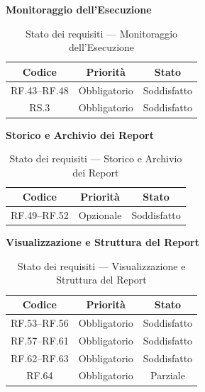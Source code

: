 \documentclass[12pt, a4paper]{article}
\begin{document}
\medskip
\noindent\textbf{Monitoraggio dell'Esecuzione}
\medskip

\begin{table}[H]
    \centering
    \renewcommand{\arraystretch}{1.3}
    \begin{tabular}{|c|c|c|}
        \hline
        \textbf{Codice} & \textbf{Priorità} & \textbf{Stato} \\ \hline
        RF.43--RF.48 & Obbligatorio & Soddisfatto \\ \hline
        RS.3 & Obbligatorio & Soddisfatto \\ \hline
    \end{tabular}
    \caption{Stato dei requisiti — Monitoraggio dell'Esecuzione}
    \label{tab:req-monitoraggio}
\end{table}

\medskip
\noindent\textbf{Storico e Archivio dei Report}
\medskip

\begin{table}[H]
    \centering
    \renewcommand{\arraystretch}{1.3}
    \begin{tabular}{|c|c|c|}
        \hline
        \textbf{Codice} & \textbf{Priorità} & \textbf{Stato} \\ \hline
        RF.49--RF.52 & Opzionale & Soddisfatto \\ \hline
    \end{tabular}
    \caption{Stato dei requisiti — Storico e Archivio dei Report}
    \label{tab:req-storico}
\end{table}

\medskip
\noindent\textbf{Visualizzazione e Struttura del Report}
\medskip

\begin{table}[H]
    \centering
    \renewcommand{\arraystretch}{1.3}
    \begin{tabular}{|c|c|c|}
        \hline
        \textbf{Codice} & \textbf{Priorità} & \textbf{Stato} \\ \hline
        RF.53--RF.56 & Obbligatorio & Soddisfatto \\ \hline
        RF.57--RF.61 & Obbligatorio & Soddisfatto \\ \hline
        RF.62--RF.63 & Obbligatorio & Soddisfatto \\ \hline
        RF.64 & Obbligatorio & Parziale \\ \hline
        
    \end{tabular}
    \caption{Stato dei requisiti — Visualizzazione e Struttura del Report}
    \label{tab:req-visualizzazione}
\end{table}
\end{document}
